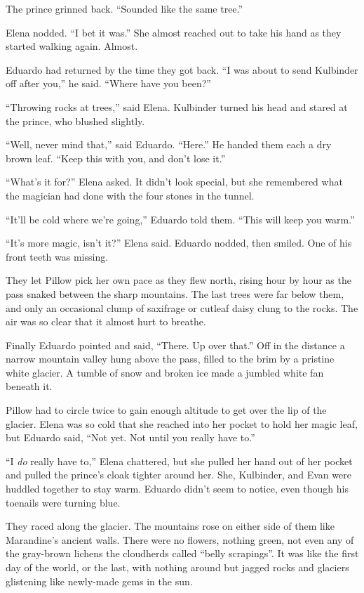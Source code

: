 \documentclass[10pt]{book}
\begin{document}
The prince grinned back. ``Sounded like the same tree.''

Elena nodded. ``I bet it was.'' She almost reached out to take his hand as they started walking again. Almost.

Eduardo had returned by the time they got back. ``I was about to send Kulbinder off after you,'' he said. ``Where have you been?''

``Throwing rocks at trees,'' said Elena. Kulbinder turned his head and stared at the prince, who blushed slightly.

``Well, never mind that,'' said Eduardo. ``Here.'' He handed them each a dry brown leaf. ``Keep this with you, and don't lose it.''

``What's it for?'' Elena asked. It didn't look special, but she remembered what the magician had done with the four stones in the tunnel.

``It'll be cold where we're going,'' Eduardo told them. ``This will keep you warm.''

``It's more magic, isn't it?'' Elena said. Eduardo nodded, then smiled. One of his front teeth was missing.

They let Pillow pick her own pace as they flew north, rising hour by hour as the pass snaked between the sharp mountains. The last trees were far below them, and only an occasional clump of saxifrage or cutleaf daisy clung to the rocks. The air was so clear that it almost hurt to breathe.

Finally Eduardo pointed and said, ``There. Up over that.'' Off in the distance a narrow mountain valley hung above the pass, filled to the brim by a pristine white glacier. A tumble of snow and broken ice made a jumbled white fan beneath it.

Pillow had to circle twice to gain enough altitude to get over the lip of the glacier. Elena was so cold that she reached into her pocket to hold her magic leaf, but Eduardo said, ``Not yet. Not until you really have to.''

``I \emph{do} really have to,'' Elena chattered, but she pulled her hand out of her pocket and pulled the prince's cloak tighter around her. She, Kulbinder, and Evan were huddled together to stay warm. Eduardo didn't seem to notice, even though his toenails were turning blue.

They raced along the glacier. The mountains rose on either side of them like Marandine's ancient walls. There were no flowers, nothing green, not even any of the gray-brown lichens the cloudherds called ``belly scrapings''. It was like the first day of the world, or the last, with nothing around but jagged rocks and glaciers glistening like newly-made gems in the sun.
\end{document}
